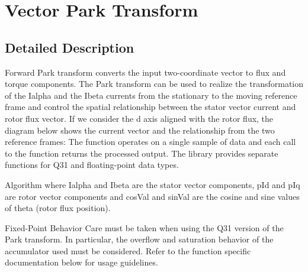\hypertarget{group__park}{\section{Vector Park Transform}
\label{group__park}
}


\subsection{Detailed Description}
Forward Park transform converts the input two-\/coordinate vector to flux and torque components. The Park transform can be used to realize the transformation of the {\ttfamily Ialpha} and the {\ttfamily Ibeta} currents from the stationary to the moving reference frame and control the spatial relationship between the stator vector current and rotor flux vector. If we consider the d axis aligned with the rotor flux, the diagram below shows the current vector and the relationship from the two reference frames\-:  The function operates on a single sample of data and each call to the function returns the processed output. The library provides separate functions for Q31 and floating-\/point data types. \begin{DoxyParagraph}{Algorithm}
 where {\ttfamily Ialpha} and {\ttfamily Ibeta} are the stator vector components, {\ttfamily p\-Id} and {\ttfamily p\-Iq} are rotor vector components and {\ttfamily cos\-Val} and {\ttfamily sin\-Val} are the cosine and sine values of theta (rotor flux position). 
\end{DoxyParagraph}
\begin{DoxyParagraph}{Fixed-\/\-Point Behavior}
Care must be taken when using the Q31 version of the Park transform. In particular, the overflow and saturation behavior of the accumulator used must be considered. Refer to the function specific documentation below for usage guidelines. 
\end{DoxyParagraph}
